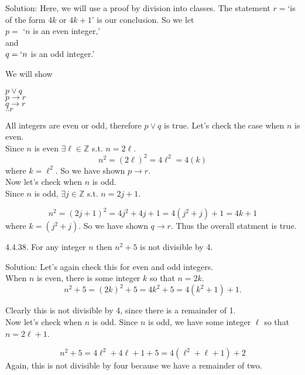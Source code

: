\documentclass[16 pt]{amsart}
\theoremstyle{definition}
\theoremstyle{remark}
\numberwithin{equation}{subsection}
\newcommand{\Z}{\mathbb{Z}}
\begin{document}
Solution: Here, we will use a proof by division into classes.
The statement $r=$`is of the form $4k$ or $4k+1$' is our conclusion.
So we let\\
 $p=$ `$n$ is an even integer,'\\
  and\\ 
  $q= `n$ is an odd integer.'

We will show
\begin{center}
$p\vee q$\\
$p\rightarrow r$\\
$q\rightarrow r$\\
$\therefore r$
\end{center}

All integers are even or odd, therefore $p\vee q$ is true.
Let's check the case when $n$ is even.\\
Since $n$ is even $\exists \ell\in\mathbb{Z}$ s.t. $n=2\ell$.\\
\[
n^2 = (2\ell)^2 = 4\ell^2 = 4 (k) 
\]
where $k=\ell^2$. So we have shown $p\rightarrow r$.\\

Now let's check when $n$ is odd.\\
Since $n$ is odd, $\exists j\in\Z$ s.t. $n=2j+1.$

\[
n^2 = (2j+1)^2 = 4j^2+4j+1 = 4(j^2+j) + 1 = 4k+1
\]
where $k=(j^2+j)$.  So we have shown $q\rightarrow r$.
Thus the overall statment is true.



\newpage

4.4.38. For any integer $n$ then $n^2+5$ is not divisible by 4.

\vspace{1in}

Solution: Let's again check this for even and odd integers.\\

When $n$ is even, there is some integer $k$ so that $n=2k$.
\[
n^2 + 5 = (2k)^2 + 5 = 4k^2 + 5 = 4(k^2+1) + 1.
\]

Clearly this is not divisible by 4, since there is a remainder of 1.\\

Now let's check when $n$ is odd.  Since $n$ is odd, we have some integer $\ell$ so that $n=2\ell+1$.

\[
n^2+5 = 4\ell^2 + 4\ell + 1+ 5 = 4(\ell^2+ \ell + 1) + 2
\]
Again, this is not divisible by four because we have a remainder of two.
\end{document}
